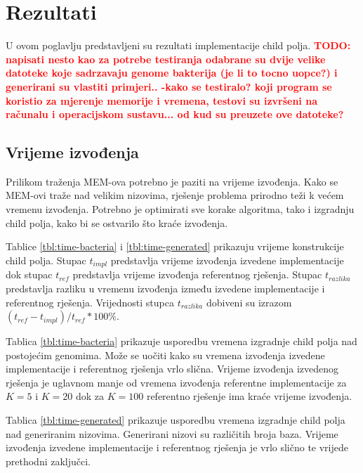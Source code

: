 \documentclass[times, utf8, seminar, numeric]{fer}
\newcommand\todo[1]{\textbf{\textcolor{red}{TODO: #1}}}
\begin{document}
\chapter{Rezultati}
U ovom poglavlju predstavljeni su rezultati implementacije child polja. \todo{napisati nesto kao za potrebe testiranja odabrane su dvije velike datoteke koje sadrzavaju genome bakterija (je li to tocno uopce?) i generirani su vlastiti primjeri.. -kako se testiralo? koji program se koristio za mjerenje memorije i vremena, testovi su izvršeni na računalu i operacijskom sustavu... od kud su preuzete ove datoteke?}

\section{Vrijeme izvođenja}
Prilikom traženja MEM-ova potrebno je paziti na vrijeme izvođenja. Kako se MEM-ovi traže nad velikim nizovima, rješenje problema prirodno teži k većem vremenu izvođenja. Potrebno je optimirati sve korake algoritma, tako i izgradnju child polja, kako bi se ostvarilo što kraće izvođenja. 

Tablice \ref{tbl:time-bacteria} i \ref{tbl:time-generated} prikazuju vrijeme konstrukcije child polja. Stupac $t_{impl}$  predstavlja vrijeme izvođenja izvedene implementacije dok stupac $t_{ref}$ predstavlja vrijeme izvođenja referentnog rješenja. Stupac $t_{razlika}$ predstavlja razliku u vremenu izvođenja između izvedene implementacije i referentnog rješenja. Vrijednosti stupca $t_{razlika}$ dobiveni su izrazom $(t_{ref} - t_{impl}) / t_{ref} * 100\%$.

Tablica \ref{tbl:time-bacteria} prikazuje usporedbu vremena izgradnje child polja nad postojećim genomima. Može se uočiti kako su vremena izvođenja izvedene implementacije i referentnog rješenja vrlo slična. Vrijeme izvođenja izvedenog rješenja je uglavnom manje od vremena izvođenja referentne implementacije za $K=5$ i $K=20$ dok za $K=100$ referentno rješenje ima kraće vrijeme izvođenja.

Tablica \ref{tbl:time-generated} prikazuje usporedbu vremena izgradnje child polja nad generiranim nizovima. Generirani nizovi su različitih broja baza. Vrijeme izvođenja izvedene implementacije i referentnog rješenja je vrlo slično te vrijede prethodni zaključci.
 
\end{document}

